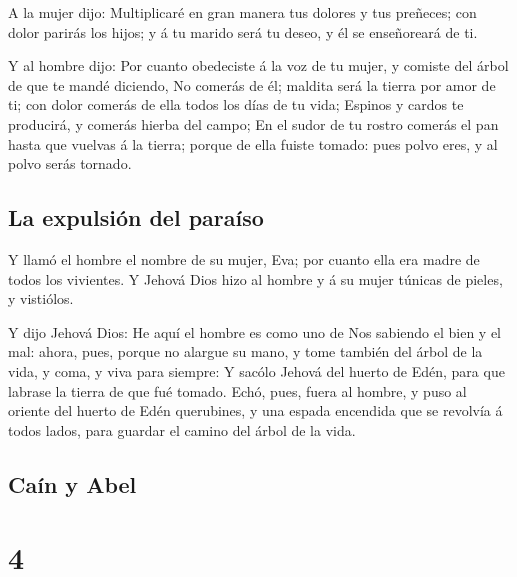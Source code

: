  A la mujer dijo: Multiplicaré en gran manera tus dolores
y tus preñeces; con dolor parirás los hijos; y á tu marido será tu
deseo, y él se enseñoreará de ti.

 Y al hombre dijo: Por cuanto obedeciste á la voz de tu
mujer, y comiste del árbol de que te mandé diciendo, No comerás de él;
maldita será la tierra por amor de ti; con dolor comerás de ella todos
los días de tu vida;  Espinos y cardos te producirá, y
comerás hierba del campo;  En el sudor de tu rostro
comerás el pan hasta que vuelvas á la tierra; porque de ella fuiste
tomado: pues polvo eres, y al polvo serás tornado.

\hypertarget{la-expulsiuxf3n-del-parauxedso}{%
\subsection{La expulsión del
paraíso}\label{la-expulsiuxf3n-del-parauxedso}}

 Y llamó el hombre el nombre de su mujer, Eva; por cuanto
ella era madre de todos los vivientes.  Y Jehová Dios
hizo al hombre y á su mujer túnicas de pieles, y vistiólos.

 Y dijo Jehová Dios: He aquí el hombre es como uno de Nos
sabiendo el bien y el mal: ahora, pues, porque no alargue su mano, y
tome también del árbol de la vida, y coma, y viva para siempre:
 Y sacólo Jehová del huerto de Edén, para que labrase la
tierra de que fué tomado.  Echó, pues, fuera al hombre, y
puso al oriente del huerto de Edén querubines, y una espada encendida
que se revolvía á todos lados, para guardar el camino del árbol de la
vida.

\hypertarget{cauxedn-y-abel}{%
\subsection{Caín y Abel}\label{cauxedn-y-abel}}

\hypertarget{section-01-4}{%
\section{4}\label{section-01-4}}

